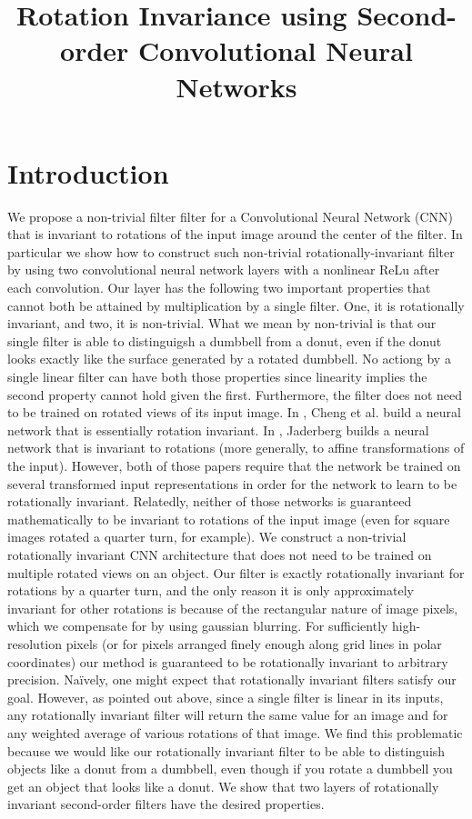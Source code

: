 \documentclass{article}
\begin{document}
\title{Rotation Invariance using Second-order Convolutional Neural Networks}

\section{Introduction}
We propose a non-trivial filter filter for a Convolutional Neural Network (CNN) that is invariant to rotations of the input image around the center of the filter. 
In particular we show how to construct such non-trivial rotationally-invariant filter by using two convolutional neural network layers with a nonlinear ReLu after each convolution.
Our layer has the following two important properties that cannot both be attained by multiplication by a single filter.
One, it is rotationally invariant, and two, it is non-trivial. 
What we mean by non-trivial is that our single filter is able to distinguigsh a dumbbell from a donut, even if the donut looks exactly like the surface generated by a rotated dumbbell.
No actiong by a single linear filter can have both those properties since linearity implies the second property cannot hold given the first.
Furthermore, the filter does not need to be trained on rotated views of its input image.
In \cite{chengzhouhan}, Cheng et al. build a neural network that is essentially rotation invariant.
In \cite{jaderberg}, Jaderberg builds a neural network that is invariant to rotations (more generally, to affine transformations of the input).
However, both of those papers require that the network be trained on several transformed input representations in order for the network to learn to be rotationally invariant.
Relatedly, neither of those networks is guaranteed mathematically to be invariant to rotations of the input image (even for square images rotated a quarter turn, for example).
We construct a non-trivial rotationally invariant CNN architecture that does not need to be trained on multiple rotated views on an object.
Our filter is exactly rotationally invariant for rotations by a quarter turn, and the only reason it is only approximately invariant for other rotations is because of the rectangular nature of image pixels, which we compensate for by using gaussian blurring.
For sufficiently high-resolution pixels (or for pixels arranged finely enough along grid lines in polar coordinates) our method is guaranteed to be rotationally invariant to arbitrary precision.
Na\"ively, one might expect that rotationally invariant filters satisfy our goal.
However, as pointed out above, since a single filter is linear in its inputs, any rotationally invariant filter will return the same value for an image and for any weighted average of various rotations of that image.
We find this problematic because we would like our rotationally invariant filter to be able to distinguish objects like a donut from a dumbbell, even though if you rotate a dumbbell you get an object that looks like a donut.
We show that two layers of rotationally invariant second-order filters have the desired properties.
\end{document}
